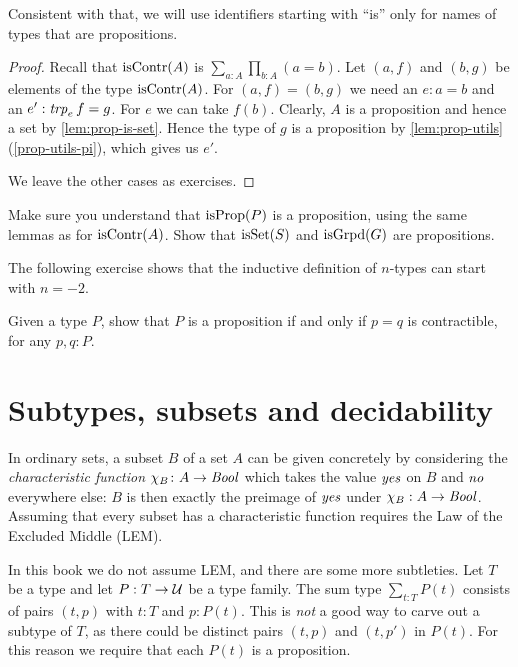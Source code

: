 Consistent with that, we will use identifiers starting with ``is'' only for names of types that are propositions.

\begin{proof}
Recall that $\mathrm{isContr}(A)$ is $\sum_{a:A} \prod_{b:A} (a=b)$.
Let $(a,f)$ and $(b,g)$ be elements of the type $\mathrm{isContr}(A)$.
For $(a,f) = (b,g)$ we need an $e : a=b$ and an $e' : \mathop{\mathit{trp}_{e}} f = g$.
For $e$ we can take $f(b)$. Clearly, $A$ is a proposition and hence
a set by \cref{lem:prop-is-set}. Hence the type of $g$ is a proposition
by \cref{lem:prop-utils}(\ref{prop-utils-pi}), which gives us $e'$.

We leave the other cases as exercises.
\end{proof}

\begin{xca}\label{xca:isX-is-prop}
Make sure you understand that $\mathrm{isProp}(P)$ is a proposition,
using the same lemmas as for $\mathrm{isContr}(A)$.
Show that $\mathrm{isSet}(S)$ and $\mathrm{isGrpd}(G)$ are propositions.
\end{xca}

The following exercise shows that the inductive definition of $n$-types can start with $n=-2$.

\begin{xca}\label{xca:prop-contractible=}
  Given a type $P$, show that $P$ is a proposition if and only if $p=q$ is contractible, for any $p, q: P$.
\end{xca}

\section{Subtypes, subsets and decidability}
\label{sec:subtype}

In ordinary sets, a subset $B$ of a set $A$ can be given concretely by 
considering the \emph{characteristic function} $\chi_B\colon A\to\mathop{\mathit{Bool}}$ 
which takes the value $\mathop{\mathit{yes}}$ on $B$ and $\mathop{\mathit{no}}$ everywhere else: 
$B$ is then exactly the preimage of $\mathop{\mathit{yes}}$ under $\chi_B: A\to\mathop{\mathit{Bool}}$.
Assuming that every subset has a characteristic function
requires the Law of the Excluded Middle (LEM).

In this book we do not assume LEM, and there are some more subtleties. 
Let $T$ be a type and let $P: T\to\mathcal{U}$ be a type family.
The sum type $\sum_{t:T} P(t)$ consists of pairs $(t,p)$ with
$t:T$ and $p:P(t)$. This is \emph{not} a good way to carve out a subtype
of $T$, as there could be distinct pairs $(t,p)$ and $(t,p')$ in $P(t)$.
For this reason we require that each $P(t)$ is a proposition.


